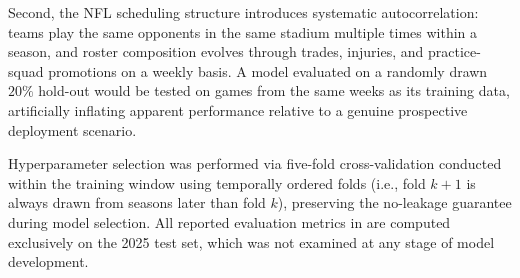 Second, the NFL scheduling structure introduces systematic autocorrelation:
teams play the same opponents in the same stadium multiple times within a
season, and roster composition evolves through trades, injuries, and
practice-squad promotions on a weekly basis. A model evaluated on a randomly
drawn $20\%$ hold-out would be tested on games from the same weeks as its
training data, artificially inflating apparent performance relative to a
genuine prospective deployment scenario.

Hyperparameter selection was performed via five-fold cross-validation
conducted within the training window using temporally ordered folds (i.e.,
fold $k+1$ is always drawn from seasons later than fold $k$), preserving
the no-leakage guarantee during model selection. All reported evaluation
metrics in  are computed exclusively on the 2025 test set,
which was not examined at any stage of model development.
